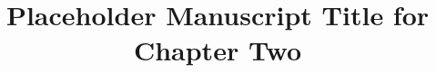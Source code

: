 \documentclass[../main.tex]{subfiles}
\title{Placeholder Manuscript Title for Chapter Two}
\affil{a}{Your Institute, Your Department, Your University, City, Country}
\begin{document}


\appendixfront



\clearpage


\clearpage



\end{document}
